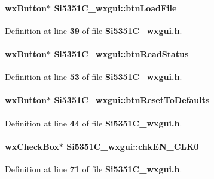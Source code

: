 \paragraph[{btn\+Load\+File}]{\setlength{\rightskip}{0pt plus 5cm}wx\+Button$\ast$ Si5351\+C\+\_\+wxgui\+::btn\+Load\+File}\label{classSi5351C__wxgui_a1f368bc774de5e4b40ef8ec3b9914d6a}


Definition at line {\bf 39} of file {\bf Si5351\+C\+\_\+wxgui.\+h}.

\paragraph[{btn\+Read\+Status}]{\setlength{\rightskip}{0pt plus 5cm}wx\+Button$\ast$ Si5351\+C\+\_\+wxgui\+::btn\+Read\+Status}\label{classSi5351C__wxgui_abc14cb805ebcd6bf35414e8cd217dd02}


Definition at line {\bf 53} of file {\bf Si5351\+C\+\_\+wxgui.\+h}.

\paragraph[{btn\+Reset\+To\+Defaults}]{\setlength{\rightskip}{0pt plus 5cm}wx\+Button$\ast$ Si5351\+C\+\_\+wxgui\+::btn\+Reset\+To\+Defaults}\label{classSi5351C__wxgui_a9a618f3d835e577bfb9776cfca8bcbcc}


Definition at line {\bf 44} of file {\bf Si5351\+C\+\_\+wxgui.\+h}.

\paragraph[{chk\+E\+N\+\_\+\+C\+L\+K0}]{\setlength{\rightskip}{0pt plus 5cm}wx\+Check\+Box$\ast$ Si5351\+C\+\_\+wxgui\+::chk\+E\+N\+\_\+\+C\+L\+K0}\label{classSi5351C__wxgui_ace91561496e91e32fa62b84a9dd2e110}


Definition at line {\bf 71} of file {\bf Si5351\+C\+\_\+wxgui.\+h}.

